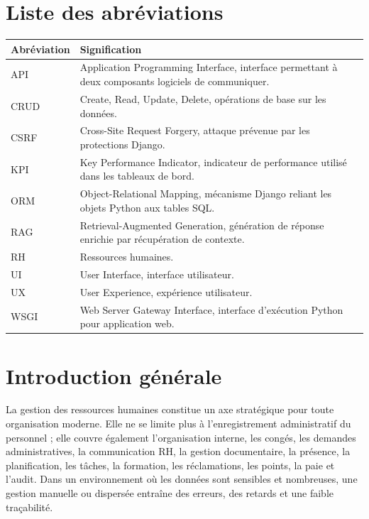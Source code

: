 \documentclass[12pt,a4paper]{report}
\begin{document}
\chapter*{Liste des abréviations}
\begin{longtable}{p{3cm}p{11cm}}
\toprule
\textbf{Abréviation} & \textbf{Signification}\\
\midrule
API & Application Programming Interface, interface permettant à deux composants logiciels de communiquer.\\
CRUD & Create, Read, Update, Delete, opérations de base sur les données.\\
CSRF & Cross-Site Request Forgery, attaque prévenue par les protections Django.\\
KPI & Key Performance Indicator, indicateur de performance utilisé dans les tableaux de bord.\\
ORM & Object-Relational Mapping, mécanisme Django reliant les objets Python aux tables SQL.\\
RAG & Retrieval-Augmented Generation, génération de réponse enrichie par récupération de contexte.\\
RH & Ressources humaines.\\
UI & User Interface, interface utilisateur.\\
UX & User Experience, expérience utilisateur.\\
WSGI & Web Server Gateway Interface, interface d'exécution Python pour application web.\\
\bottomrule
\end{longtable}
\newpage

\tableofcontents
\newpage

\setcounter{page}{1}

\chapter*{Introduction générale}
La gestion des ressources humaines constitue un axe stratégique pour toute organisation moderne. Elle ne se limite plus à l'enregistrement administratif du personnel ; elle couvre également l'organisation interne, les congés, les demandes administratives, la communication RH, la gestion documentaire, la présence, la planification, les tâches, la formation, les réclamations, les points, la paie et l'audit. Dans un environnement où les données sont sensibles et nombreuses, une gestion manuelle ou dispersée entraîne des erreurs, des retards et une faible traçabilité.
\end{document}
